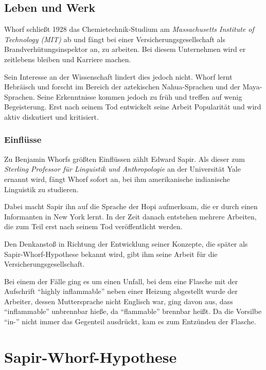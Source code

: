 \documentclass[12pt]{scrreprt}
\begin{document}
	\section{Leben und Werk}
	\label{sec:lebenuwerk}
	Whorf schließt 1928 das Chemietechnik-Studium am \textit{Massachusetts Institute of
	Technology (MIT)} ab und fängt bei einer Versicherungsgesellschaft als
	Brandverhütungsinspektor an, zu arbeiten. Bei diesem Unternehmen wird er
	zeitlebens bleiben und Karriere machen.

	Sein Interesse an der Wissenschaft lindert dies jedoch nicht. Whorf lernt
	Hebräisch und forscht im Bereich der aztekischen Nahua-Sprachen und der
	Maya-Sprachen. Seine Erkenntnisse kommen jedoch zu früh und treffen auf wenig
	Begeisterung. Erst nach seinem Tod entwickelt seine Arbeit Popularität und
	wird aktiv diskutiert und kritisiert.
		\subsection{Einflüsse}
		\label{sec:einfluesse}
		Zu Benjamin Whorfs größten Einflüssen zählt Edward Sapir. Als dieser zum
		\textit{Sterling Professor für Linguistik und Anthropologie} an der
		Universität Yale ernannt wird, fängt Whorf sofort an, bei ihm amerikanische
		indianische Linguistik zu studieren.

		Dabei macht Sapir ihn auf die Sprache der Hopi aufmerksam, die er durch einen
		Informanten in New York lernt. In der Zeit danach entstehen mehrere Arbeiten,
		die zum Teil erst nach seinem Tod veröffentlicht werden.

		Den Denkanstoß in Richtung der Entwicklung seiner Konzepte, die später als
		Sapir-Whorf-Hypothese bekannt wird, gibt ihm seine Arbeit für die
		Versicherungsgesellschaft.

		Bei einem der Fälle ging es um einen Unfall, bei dem eine Flasche mit der
		Aufschrift \enquote{highly inflammable} neben einer Heizung abgestellt wurde
		der Arbeiter, dessen Muttersprache nicht Englisch war, ging davon aus, dass
		\enquote{inflammable} unbrennbar hieße, da \enquote{flammable} brennbar
		heißt. Da die Vorsilbe \enquote{in-} nicht immer das Gegenteil ausdrückt,
		kam es zum Entzünden der Flasche.\autocite{wiki:Benjamin_Lee_Whorf}

\chapter{Sapir-Whorf-Hypothese}
\label{chap:sawo_hypothese}
\end{document}
